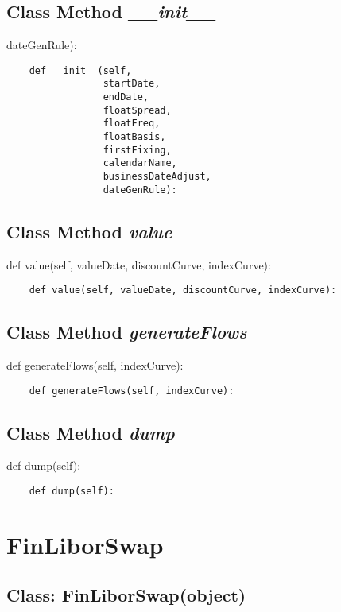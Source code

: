 \documentclass[twoside,11pt]{book}
\begin{document}
\subsection{Class Method {\it \_\_init\_\_}}
dateGenRule):

\begin{lstlisting}
    def __init__(self,
                 startDate,
                 endDate,
                 floatSpread,
                 floatFreq,
                 floatBasis,
                 firstFixing,
                 calendarName,
                 businessDateAdjust,
                 dateGenRule):
\end{lstlisting}

\subsection{Class Method {\it value}}
def value(self, valueDate, discountCurve, indexCurve):

\begin{lstlisting}
    def value(self, valueDate, discountCurve, indexCurve):
\end{lstlisting}

\subsection{Class Method {\it generateFlows}}
def generateFlows(self, indexCurve):

\begin{lstlisting}
    def generateFlows(self, indexCurve):
\end{lstlisting}

\subsection{Class Method {\it dump}}
def dump(self):

\begin{lstlisting}
    def dump(self):
\end{lstlisting}

\newpage
\section{FinLiborSwap}

\subsection{Class: FinLiborSwap(object)}
\end{document}
